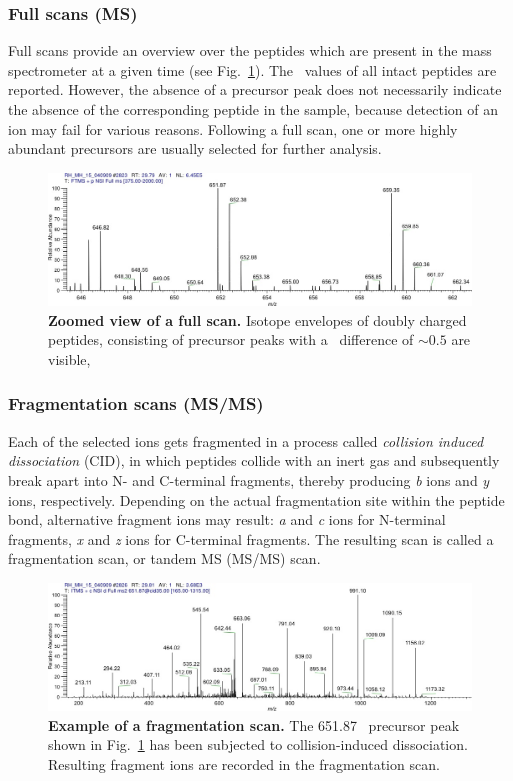 \subsubsection{Full scans (MS)}

Full scans provide an overview over the peptides which are present in the
mass spectrometer at a given time (see Fig.~\ref{fig:full-scan}).
The \mz~values of all intact peptides are reported.
However, the absence of a precursor peak does not necessarily indicate the
absence of the corresponding peptide in the sample, because detection of
an ion may fail for various reasons.
Following a full scan, one or more highly abundant precursors are usually
selected for further analysis.

\begin{figure}[h]
\includegraphics[width=\textwidth]{figures/ms1-scan.jpg}
\caption{
{\bf Zoomed view of a full scan.}
Isotope envelopes of doubly charged peptides, consisting of precursor
peaks with a \mz~difference of $\sim0.5$ are visible,
}
\label{fig:full-scan}
\end{figure}

\subsubsection{Fragmentation scans (MS/MS)}

Each of the selected ions gets fragmented in a process called
{\em collision induced dissociation} (CID), in which peptides collide with an
inert gas and subsequently break apart into N- and C-terminal fragments,
thereby producing {\em b} ions and {\em y} ions, respectively. 
Depending on the actual fragmentation site within the peptide bond,
alternative fragment ions may result: {\em a} and {\em c} ions for N-terminal
fragments, {\em x} and {\em z} ions for C-terminal fragments.
The resulting scan is called a fragmentation scan, or tandem MS (MS/MS) scan.

\begin{figure}[h]
\includegraphics[width=\textwidth]{figures/ms2-scan.jpg}
\caption{
{\bf Example of a fragmentation scan.} 
The 651.87 \mz~precursor peak shown in Fig.~\ref{fig:full-scan} has been
subjected to collision-induced dissociation.
Resulting fragment ions are recorded in the fragmentation scan.
}
\label{fig:fragmentation-scan}
\end{figure}

